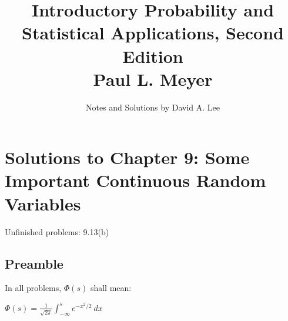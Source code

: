 \documentclass[10pt, oneside]{article}
\title{Introductory Probability and Statistical Applications, Second Edition \\
\large{Paul L. Meyer}}
\author{Notes and Solutions by David A. Lee}
\date{}							%
\begin{document}
\maketitle
\section*{Solutions to Chapter 9: Some Important Continuous Random Variables}

Unfinished problems: 9.13(b)

\subsection*{Preamble}

In all problems, $\Phi(s)$ shall mean:

$\Phi(s) = \frac{1}{\sqrt{2 \pi}} \int^s_{-\infty} e^{-x^2/2} \ dx$
\end{document}
